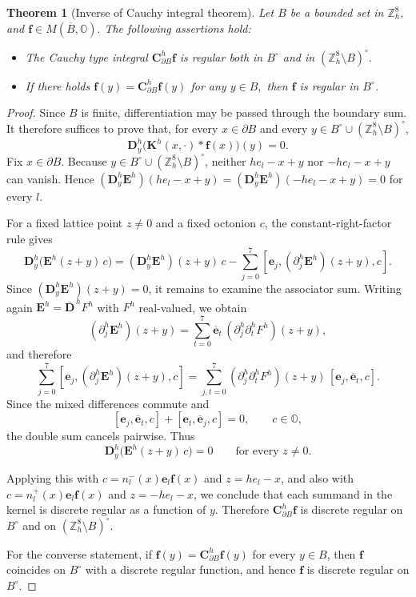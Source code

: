 \documentclass{amsart}
\newtheorem{theorem}{Theorem}[section]
\theoremstyle{definition}
\theoremstyle{remark}
\numberwithin{equation}{section}
\newcommand{\p}{\partial}
\newcommand{\OO}{\mathbb O}
\newcommand{\Z}{\mathbb Z}
\newcommand{\f}{\bm{f}}
\newcommand{\e}{\bm{e}}
\newcommand{\E}{\bm{E}}
\begin{document}
\begin{theorem}
    [Inverse of Cauchy integral theorem]\label{thm:cauchy-integral-inverse}\label{2023-09-11 17:48:54} Let $B$ be a bounded set in $\Z^8_h,$ and $\f\in M( \overline B,\OO).$ The following assertions hold:

   \begin{itemize}
    \item  The Cauchy type integral   $ \bm C^h_{\p B}\f$
      is regular both in $B^{\circ}$ and in  $(\Z^8_h\setminus B)^{\circ}.$

     \medskip

    \item   If there holds
                $ \f(y)=\bm C^h_{\p B}\f(y)$  for any $y\in   B,$
      then  $\f$ is regular in $B^\circ$.
      \end{itemize}

\end{theorem}
\begin{proof}
    Since \(B\) is finite, differentiation may be passed through the boundary sum. It therefore suffices to prove that, for every \(x\in \p B\) and every \(y\in B^{\circ}\cup (\Z^8_h\setminus B)^{\circ}\),
    \[
    \bm D_y^h\bigl(\bm K^h(x,\cdot)*\f(x)\bigr)(y)=0.
    \]
    Fix \(x\in \p B\). Because \(y\in B^{\circ}\cup (\Z^8_h\setminus B)^{\circ}\), neither \(he_l-x+y\) nor \(-he_l-x+y\) can vanish. Hence \((\bm D_y^h\E^h)(he_l-x+y)=(\bm D_y^h\E^h)(-he_l-x+y)=0\) for every \(l\).

    For a fixed lattice point \(z\neq 0\) and a fixed octonion \(c\), the constant-right-factor rule gives
    \[
    \bm D_y^h\bigl(\E^h(z+y)\,c\bigr)
    =
    (\bm D_y^h\E^h)(z+y)\,c
    -
    \sum_{j=0}^7[\e_j,(\p_j^h\E^h)(z+y),c].
    \]
    Since \((\bm D_y^h\E^h)(z+y)=0\), it remains to examine the associator sum. Writing again \(\E^h=\bm{\overline D}^{\,h}F^h\) with \(F^h\) real-valued, we obtain
    \[
    (\p_j^h\E^h)(z+y)=\sum_{t=0}^7 \bm{\overline e}_t\,(\p_j^h\p_t^hF^h)(z+y),
    \]
    and therefore
    \[
    \sum_{j=0}^7[\e_j,(\p_j^h\E^h)(z+y),c]
    =
    \sum_{j,t=0}^7 (\p_j^h\p_t^hF^h)(z+y)\,[\e_j,\bm{\overline e}_t,c].
    \]
    Since the mixed differences commute and
    \[
    [\e_j,\bm{\overline e}_t,c]+[\e_t,\bm{\overline e}_j,c]=0,
    \qquad c\in\OO,
    \]
    the double sum cancels pairwise. Thus
    \[
    \bm D_y^h\bigl(\E^h(z+y)\,c\bigr)=0
    \qquad\text{for every }z\neq 0.
    \]

    Applying this with \(c=n_l^-(x)\e_l\f(x)\) and \(z=he_l-x\), and also with \(c=n_l^+(x)\e_l\f(x)\) and \(z=-he_l-x\), we conclude that each summand in the kernel is discrete regular as a function of \(y\). Therefore \(\bm C^h_{\p B}\f\) is discrete regular on \(B^{\circ}\) and on \((\Z^8_h\setminus B)^{\circ}\).

    For the converse statement, if \(\f(y)=\bm C^h_{\p B}\f(y)\) for every \(y\in B\), then \(\f\) coincides on \(B^{\circ}\) with a discrete regular function, and hence \(\f\) is discrete regular on \(B^{\circ}\).
\end{proof}
\end{document}
